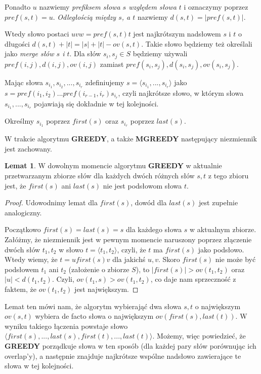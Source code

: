\documentclass[12pt]{article}
\theoremstyle{definition}
\newtheorem{lemma}{Lemat}
\begin{document}
Ponadto $u$ nazwiemy \textit{prefiksem słowa $s$ względem słowa $t$} i oznaczymy poprzez \linebreak $pref(s,t) = u$. \textit{Odległością między $s$, a $t$} nazwiemy $d(s,t)=|pref(s,t)|$.

Wtedy słowo postaci $uvw = pref(s,t)t$ jest najkrótszym nadsłowem $s$ i $t$ o długości $d(s,t) + |t| = |s| + |t| - ov(s,t)$. Takie słowo będziemy też określali jako
\textit{merge słów $s$ i $t$}. 
Dla słów $s_i, s_j \in S$ będziemy używali 
$pref(i,j), d(i, j), ov(i, j)$ zamiast \linebreak
$pref(s_i,s_j), d(s_i,s_j), ov(s_i, s_j)$.

Mając słowa $s_{i_1}, s_{i_2},...,s_{i_r}$ zdefiniujemy $s = \langle s_{i_1},...,s_{i_r}\rangle$ jako \\ $s = pref(i_1,i_2)...pref(i_{r-1}, i_r)s_{i_r}$, czyli najkrótsze słowo, w którym słowa
$s_{i_1},...,s_{i_r}$ pojawiają się dokładnie w tej kolejności.

Określmy $s_{i_1}$ poprzez $first(s)$ oraz $s_{i_r}$ poprzez $last(s)$.

W trakcie algorytmu \textbf{GREEDY}, a także \textbf{MGREEDY} następujący niezmiennik jest zachowany.

\begin{lemma}
  
W dowolnym momencie algorytmu \textbf{GREEDY} w aktualnie przetwarzanym zbiorze słów dla każdych dwóch różnych słów $s,t$ z tego zbioru jest, że 
$first(s)$ ani $last(s)$ nie jest podsłowom słowa $t$.

\end{lemma}

\begin{proof}
Udowodnimy lemat dla $first(s)$, dowód dla $last(s)$ jest zupełnie analogiczny.

Początkowo $first(s)=last(s)=s$ dla każdego słowa $s$ w aktualnym zbiorze. Załóżmy, że niezmiennik jest w pewnym momencie naruszony poprzez złączenie dwóch słów 
$t_1,t_2$ w słowo $t = \langle t_1,t_2\rangle$, czyli, że $t$ ma $first(s)$ jako podsłowo. Wtedy wiemy, że 
$t = ufirst(s)v$ dla jakichś $u,v$. Skoro $first(s)$ nie może być podsłowem 
$t_1$ ani $t_2$ (założenie o zbiorze $S$), to $|first(s)| > ov(t_1,t_2)$ oraz 
$|u| < d(t_1,t_2)$. Czyli, $ov(t_1, s) > ov(t_1, t_2)$, co daje nam sprzeczność z faktem, że $ov(t_1,t_2)$ jest największym.
\end{proof}

Lemat ten mówi nam, że algorytm wybierająć dwa słowa $s,t$ o największym $ov(s,t)$ wybiera de facto słowa o największym $ov(first(s), last(t))$.
W wyniku takiego łączenia powstaje słowo $\langle first(s),...,last(s),first(t),...,last(t)\rangle$.
Możemy, więc powiedzieć, że \textbf{GREEDY} porządkuje słowa w ten sposób (dla każdej pary słów porównując ich overlap'y), a następnie 
znajduje najkrótsze wspólne nadsłowo zawierające te słowa w tej kolejności.
\end{document}
